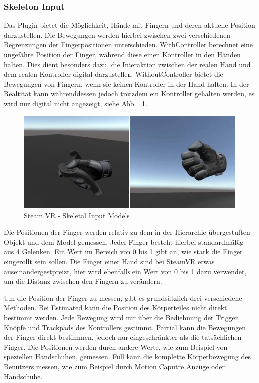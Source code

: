 \subsubsection{Skeleton Input}
Das Plugin bietet die Möglichkeit, Hände mit Fingern und deren aktuelle Position darzustellen.
Die Bewegungen werden hierbei zwischen zwei verschiedenen Begrenzungen der Fingerpositionen unterschieden.
WithController berechnet eine ungefähre Position der Finger, während diese einen Kontroller in den Händen halten.
Dies dient besonders dazu, die Interaktion zwischen der realen Hand und dem realen Kontroller digital darzustellen.
WithoutController bietet die Bewegungen von Fingern, wenn sie keinen Kontroller in der Hand halten.
In der Realtität kann währenddessen jedoch trotzdem ein Kontroller gehalten werden, es wird nur digital nicht angezeigt, siehe Abb. ~\ref{fig:steamvr_skeletal_input_models}.
\begin {figure}
    \centering
    \includegraphics[scale=1]{pics/steamVR_skeletal_input_models}
    \caption{Steam VR - Skeletal Input Models}
    \label{fig:steamvr_skeletal_input_models}
\end {figure}
Die Positionen der Finger werden relativ zu dem in der Hierarchie übergestuften Objekt und dem Model gemessen.
Jeder Finger besteht hierbei standardmäßig aus 4 Gelenken.
Ein Wert im Bereich von 0 bis 1 gibt an, wie stark die Finger eingerollt sein sollen.
Die Finger einer Hand sind bei SteamVR etwas auseinandergestpreizt, hier wird ebenfalls ein Wert von 0 bis 1 dazu verwendet, um die Distanz zwischen den Fingern zu verändern.

Um die Position der Finger zu messen, gibt es grundsätzlich drei verschiedene Methoden.
Bei Estimated kann die Position des Körperteiles nicht direkt bestimmt werden.
Jede Bewegung wird nur über die Bediehnung der Trigger, Knöpfe und Trackpads des Kontrollers gestimmt.
Partial kann die Bewegungen der Finger direkt bestimmen, jedoch nur eingeschränkter als die tatsächlichen Finger.
Die Positionen werden durch andere Werte, wie zum Beispiel von speziellen Handschuhen, gemessen.
Full kann die komplette Körperbewegung des Benutzers messen, wie zum Beispiel durch Motion Caputre Anzüge oder Handschuhe.

